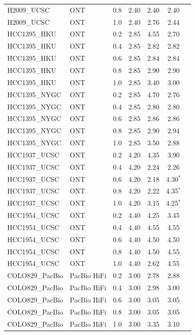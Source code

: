\documentclass[pdflatex,sn-nature]{sn-jnl}
\begin{document}
\begin{small}
\begin{longtable}{@{}llccccc@{}}
  H2009\_UCSC & ONT & 0.8 & 2.40 & 2.40 & 2.40 \\
  H2009\_UCSC & ONT & 1.0 & 2.40 & 2.76 & 2.44 \\
  \addlinespace
  HCC1395\_HKU & ONT & 0.2 & 2.85 & 4.55 & 2.70 \\
  HCC1395\_HKU & ONT & 0.4 & 2.85 & 2.82 & 2.82 \\
  HCC1395\_HKU & ONT & 0.6 & 2.85 & 2.84 & 2.84 \\
  HCC1395\_HKU & ONT & 0.8 & 2.85 & 2.90 & 2.90 \\
  HCC1395\_HKU & ONT & 1.0 & 2.85 & 3.40 & 3.00 \\
  \addlinespace
  HCC1395\_NYGC & ONT & 0.2 & 2.85 & 4.70 & 2.76 \\
  HCC1395\_NYGC & ONT & 0.4 & 2.85 & 2.80 & 2.80 \\
  HCC1395\_NYGC & ONT & 0.6 & 2.85 & 2.86 & 2.86 \\
  HCC1395\_NYGC & ONT & 0.8 & 2.85 & 2.90 & 2.94 \\
  HCC1395\_NYGC & ONT & 1.0 & 2.85 & 3.50 & 2.88 \\
  \addlinespace
  HCC1937\_UCSC & ONT & 0.2 & 4.20 & 4.35 & 3.90 \\
  HCC1937\_UCSC & ONT & 0.4 & 4.20 & 2.24 & 2.26 \\
  HCC1937\_UCSC & ONT & 0.6 & 4.20 & 2.18 & 4.30$^{*}$ \\
  HCC1937\_UCSC & ONT & 0.8 & 4.20 & 2.22 & 4.35$^{*}$ \\
  HCC1937\_UCSC & ONT & 1.0 & 4.20 & 3.15 & 4.25$^{*}$ \\
  \addlinespace
  HCC1954\_UCSC & ONT & 0.2 & 4.40 & 4.25 & 3.45 \\
  HCC1954\_UCSC & ONT & 0.4 & 4.40 & 4.55 & 4.55 \\
  HCC1954\_UCSC & ONT & 0.6 & 4.40 & 4.50 & 4.50 \\
  HCC1954\_UCSC & ONT & 0.8 & 4.40 & 4.50 & 4.55 \\
  HCC1954\_UCSC & ONT & 1.0 & 4.40 & 2.62 & 4.55 \\
  \addlinespace
  COLO829\_PacBio & PacBio HiFi & 0.2 & 3.00 & 2.78 & 2.88 \\
  COLO829\_PacBio & PacBio HiFi & 0.4 & 3.00 & 2.98 & 3.00 \\
  COLO829\_PacBio & PacBio HiFi & 0.6 & 3.00 & 3.05 & 3.05 \\
  COLO829\_PacBio & PacBio HiFi & 0.8 & 3.00 & 3.05 & 3.05 \\
  COLO829\_PacBio & PacBio HiFi & 1.0 & 3.00 & 3.35 & 3.10 \\

\end{longtable}
\end{small}
\end{document}
